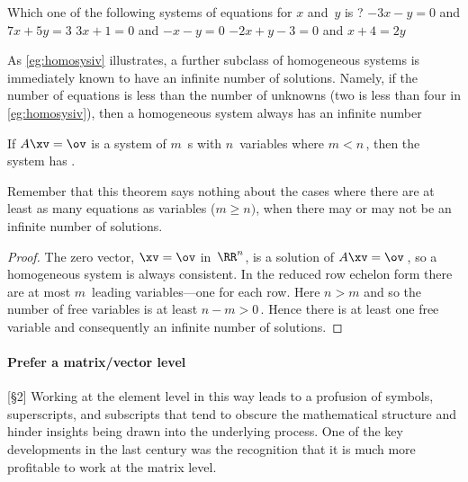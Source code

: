 \begin{activity}
Which one of the following systems of equations for \(x\) and~\(y\) is ?
{\(-3x-y=0\) and \(7x+5y=3\)}
{\(3x+1=0\) and \(-x-y=0\)}
{\(-2x+y-3=0\) and \(x+4=2y\)}
\end{activity}





As \cref{eg:homosysiv} illustrates, a further subclass of homogeneous systems is immediately known to have an infinite number of solutions.
Namely, if the number of equations is less than the number of unknowns (two is less than four in \cref{eg:homosysiv}), then a homogeneous system always has an infinite number 


\begin{theorem} \label{thm:feweqns} 
If \(A\xv=\ov\) is a  system of \(m\)~s with \(n\)~variables where \(m<n\)\,, then the system has .
\end{theorem}

Remember that this theorem says nothing about the cases where there are at least as many equations as variables (\(m\geq n)\), when there may or may not be an infinite number of solutions.

\begin{proof} 
The zero vector, \(\xv=\ov\) in~\(\RR^n\), is a solution of \(A\xv=\ov\)\,, so a homogeneous system is always consistent.
In the reduced row echelon form there are at most \(m\)~leading variables---one for each row.
Here \(n>m\) and so the number of free variables is at least \(n-m>0\)\,.
Hence there is at least one free variable and consequently an infinite number of solutions.
\end{proof}




\paragraph{Prefer a matrix/vector level}
\begin{quoted}{\cite{Higham2015b} [\S2]}
Working at the element level in this way leads to a profusion of symbols, superscripts, and subscripts that tend to obscure the mathematical structure and hinder insights being drawn into the underlying process.
One of the key developments in the last century was the recognition that it is much more profitable to work at the matrix level.
\end{quoted}

